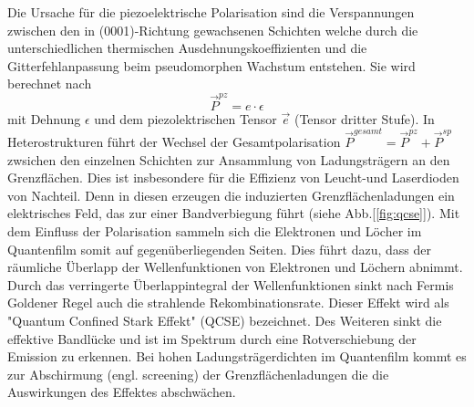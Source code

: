 \noindent
Die Ursache für die piezoelektrische Polarisation sind die Verspannungen zwischen den in (0001)-Richtung gewachsenen Schichten welche durch die unterschiedlichen thermischen Ausdehnungskoeffizienten und die Gitterfehlanpassung beim pseudomorphen Wachstum entstehen. Sie wird berechnet nach
%
\begin{equation}
    \vec{P}^{pz} = e \cdot \epsilon
\end{equation}
%
mit Dehnung $\epsilon$ und dem piezolektrischen Tensor $\vec{e}$ (Tensor dritter Stufe).
\newline
In Heterostrukturen führt der Wechsel der Gesamtpolarisation $\vec{P}^{gesamt} = \vec{P}^{pz} + \vec{P}^{sp}$ zwsichen den einzelnen Schichten zur Ansammlung von Ladungsträgern an den Grenzflächen. Dies ist insbesondere für die Effizienz von Leucht-und Laserdioden von Nachteil. Denn in diesen erzeugen die induzierten Grenzflächenladungen ein elektrisches Feld, das zur einer Bandverbiegung führt (siehe Abb.[\ref{fig:qcse}]). Mit dem Einfluss der Polarisation sammeln sich die Elektronen und Löcher im Quantenfilm somit auf gegenüberliegenden Seiten. Dies führt dazu, dass der räumliche Überlapp der Wellenfunktionen von Elektronen und Löchern abnimmt. Durch das verringerte Überlappintegral der Wellenfunktionen sinkt nach Fermis Goldener Regel auch die strahlende Rekombinationsrate. Dieser Effekt wird als "Quantum Confined Stark Effekt" (QCSE) bezeichnet. Des Weiteren sinkt die effektive Bandlücke und ist im Spektrum durch eine Rotverschiebung der Emission zu erkennen. Bei hohen Ladungsträgerdichten im Quantenfilm kommt es zur Abschirmung (engl. screening) der Grenzflächenladungen die die Auswirkungen des Effektes abschwächen.
